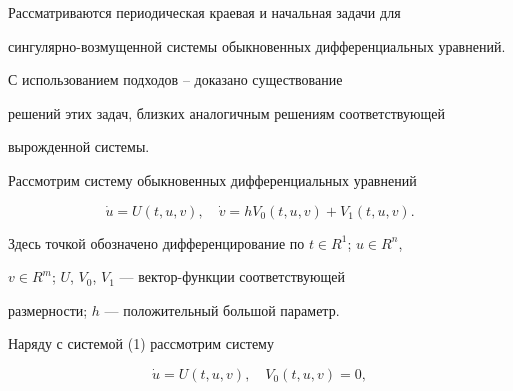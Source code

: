  


\date{} 




 


\pagestyle{plain} %


 


 




 


\maketitle 


\label{begin} 


 


Рассматриваются периодическая краевая и начальная задачи для 


сингулярно-возмущенной системы обыкновенных дифференциальных уравнений. 


С использованием подходов \cite{1}--\cite{4} доказано существование 


решений этих задач, близких аналогичным решениям соответствующей 


вырожденной системы. 


 


Рассмотрим систему обыкновенных дифференциальных уравнений 


\begin{equation} 


\Dot u=U(t,u,v),\quad \Dot v=hV_0(t,u,v)+V_1(t,u,v). 


\end{equation} 


Здесь точкой обозначено дифференцирование по $t\in R^1$; $u\in R^n$, 


$v\in R^m$; $U$, $V_0$, $V_1$ --- вектор-функции соответствующей 


размерности; $h$ --- положительный большой параметр. 


 


Наряду с системой (1) рассмотрим систему 


\begin{equation} 


\Dot u=U(t,u,v),\quad V_0(t,u,v)=0, 


\end{equation} 


